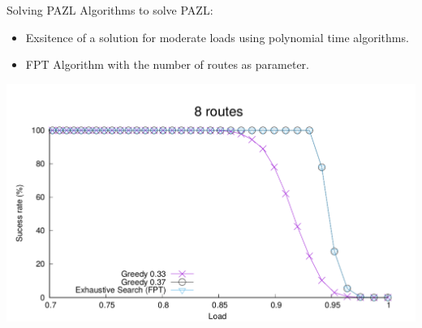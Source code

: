 \documentclass[10 pt]{beamer}
\begin{document}
\begin{frame}{Solving PAZL}
Algorithms to solve PAZL:
\begin{itemize}
  \item Exsitence of a solution for moderate loads using polynomial time algorithms.
  \item FPT Algorithm with the number of routes as parameter.
  \end{itemize}
\begin{center}
  \includegraphics[scale=0.4]{pazlshort8.pdf}\\
 \end{center} 


\end{frame}
\end{document}
